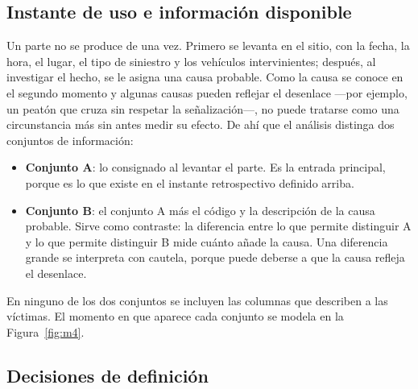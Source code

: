 \subsection{Instante de uso e información disponible}

Un parte no se produce de una vez. Primero se levanta en el sitio, con la fecha, la hora, el lugar, el tipo de siniestro y los vehículos intervinientes; después, al investigar el hecho, se le asigna una causa probable. Como la causa se conoce en el segundo momento y algunas causas pueden reflejar el desenlace ---por ejemplo, un peatón que cruza sin respetar la señalización---, no puede tratarse como una circunstancia más sin antes medir su efecto. De ahí que el análisis distinga dos conjuntos de información:

\begin{itemize}[leftmargin=1.6em]
\item \textbf{Conjunto A}: lo consignado al levantar el parte. Es la entrada principal, porque es lo que existe en el instante retrospectivo definido arriba.
\item \textbf{Conjunto B}: el conjunto A más el código y la descripción de la causa probable. Sirve como contraste: la diferencia entre lo que permite distinguir A y lo que permite distinguir B mide cuánto añade la causa. Una diferencia grande se interpreta con cautela, porque puede deberse a que la causa refleja el desenlace.
\end{itemize}

En ninguno de los dos conjuntos se incluyen las columnas que describen a las víctimas. El momento en que aparece cada conjunto se modela en la Figura~\ref{fig:m4}.

\subsection{Decisiones de definición}

